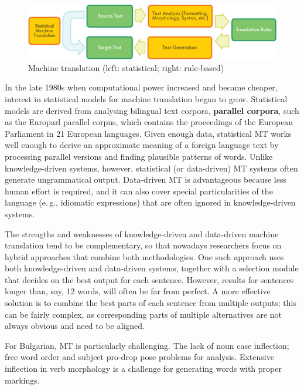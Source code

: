 \documentclass[]{../../metanetpaper}
\begin{document}
\begin{multicols}{2}
\begin{figure}[htb]
  \center
  \includegraphics[width=\textwidth]{../_media/english/machine_translation}
  \caption{Machine translation (left: statistical; right: rule-based)}
  \label{fig:mtarch_en}
\end{figure}
 
In the late 1980s when computational power increased and became cheaper, interest in statistical models for machine translation began to grow. Statistical models are derived from analysing bilingual text corpora, \textbf{parallel corpora}, such as the Europarl parallel corpus, which contains the proceedings of the European Parliament in 21 European languages. Given enough data, statistical MT works well enough to derive an approximate meaning of a foreign language text by processing parallel versions and finding plausible patterns of words. Unlike knowledge-driven systems, however, statistical (or data-driven) MT systems often generate ungrammatical output. Data-driven MT is advantageous because less human effort is required, and it can also cover special particularities of the language (e.\,g., idiomatic expressions) that are often ignored in knowledge-driven systems. 

The strengths and weaknesses of knowledge-driven and data-driven machine translation tend to be complementary, so that nowadays researchers focus on hybrid approaches that combine both methodologies. One such approach uses both knowledge-driven and data-driven systems, together with a selection module that decides on the best output for each sentence. However, results for sentences longer than, say, 12 words, will often be far from perfect. A more effective solution is to combine the best parts of each sentence from multiple outputs; this can be fairly complex, as corresponding parts of multiple alternatives are not always obvious and need to be aligned. 

 
For Bulgarian, MT is particularly challenging. The lack of noun case inflection; free word order and subject pro-drop pose problems for analysis. Extensive inflection in verb morphology is a challenge for generating words with proper markings. 


\end{multicols}
\end{document}
